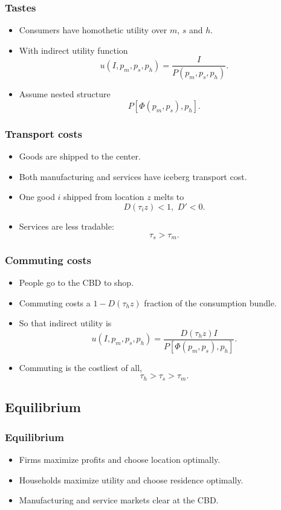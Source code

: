 \documentclass[handout,compress,mathserif]{beamer}
\begin{document}
\begin{frame}\frametitle{Tastes}
\begin{itemize}
    \item Consumers have homothetic utility over $m$, $s$ and $h$.
    \item With indirect utility function
    \[
    u(I,p_m,p_s,p_h) = \frac{I}{P(p_m,p_s,p_h)}.
    \]
    \item Assume nested structure
    \[
    P[\Phi(p_m,p_s),p_h].
    \]
\end{itemize}
\end{frame}


\begin{frame}\frametitle{Transport costs}
\begin{itemize}
    \item Goods are shipped to the center.
    \item Both manufacturing and services have iceberg transport cost.
    \item One good $i$ shipped from location $z$ melts to
    \[
    D(\tau_iz)<1,\,\,D'<0.
    \]
    \item Services are less tradable:
    \[
    \tau_s>\tau_m.
    \]
\end{itemize}
\end{frame}

\begin{frame}\frametitle{Commuting costs}
\begin{itemize}
    \item People go to the CBD to shop.
    \item Commuting costs a $1-D(\tau_h z)$ fraction of the consumption bundle.
    \item So that indirect utility is
    \[
    u(I,p_m,p_s,p_h) = \frac{D(\tau_h z)I}{P[\Phi(p_m,p_s),p_h]}.
    \]
    \item Commuting is the costliest of all,
    \[
    \tau_h>\tau_s>\tau_m.
    \]
\end{itemize}
\end{frame}

\subsection{Equilibrium}

\begin{frame}\frametitle{Equilibrium}
\begin{itemize}
    \item Firms maximize profits and choose location optimally.
    \item Households maximize utility and choose residence optimally.
    \item Manufacturing and service markets clear at the CBD.
\end{itemize}
\end{frame}
\end{document}
